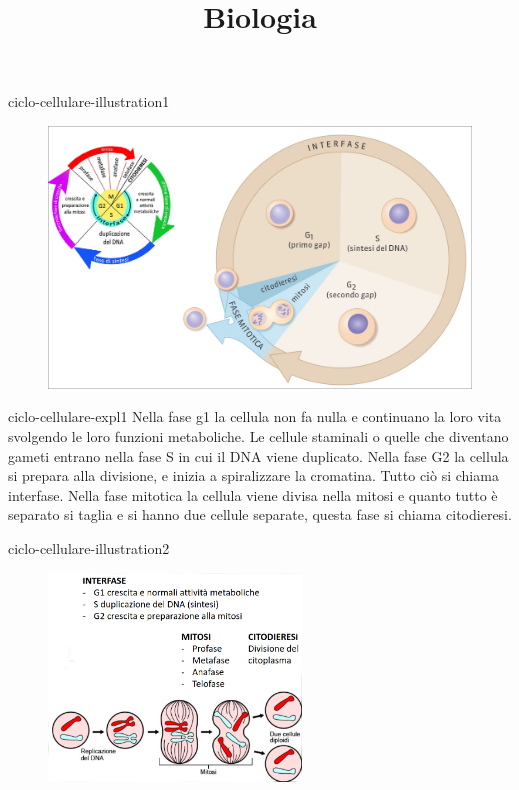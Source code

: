 \documentclass[preview]{standalone}
\begin{document}
\title{Biologia}
\genpage

\begin{snippet}{ciclo-cellulare-illustration1}
    \begin{center}
    \begin{figure}[ht]
        \centering
        \includegraphics[width=\textwidth]{./resources/ciclo_cellulare}
    \end{figure}
    \end{center}
\end{snippet}

\begin{snippet}{ciclo-cellulare-expl1}
    Nella fase g1 la cellula non fa nulla e continuano la loro vita svolgendo le loro funzioni metaboliche. 
    Le cellule staminali o quelle che diventano gameti entrano nella fase S in cui il DNA viene duplicato. 
    Nella fase G2 la cellula si prepara alla divisione, e inizia a spiralizzare la cromatina. 
    Tutto ciò si chiama interfase.
    Nella fase mitotica la cellula viene divisa nella mitosi e quanto tutto è separato si taglia e si hanno due cellule separate, questa fase si chiama citodieresi.
\end{snippet}

\begin{snippet}{ciclo-cellulare-illustration2}
    \begin{center}
    \begin{figure}[ht]
        \centering
        \includegraphics[width=0.6\textwidth]{./resources/ciclo_cellulare2}
    \end{figure}
    \end{center}
\end{snippet}
\end{document}
